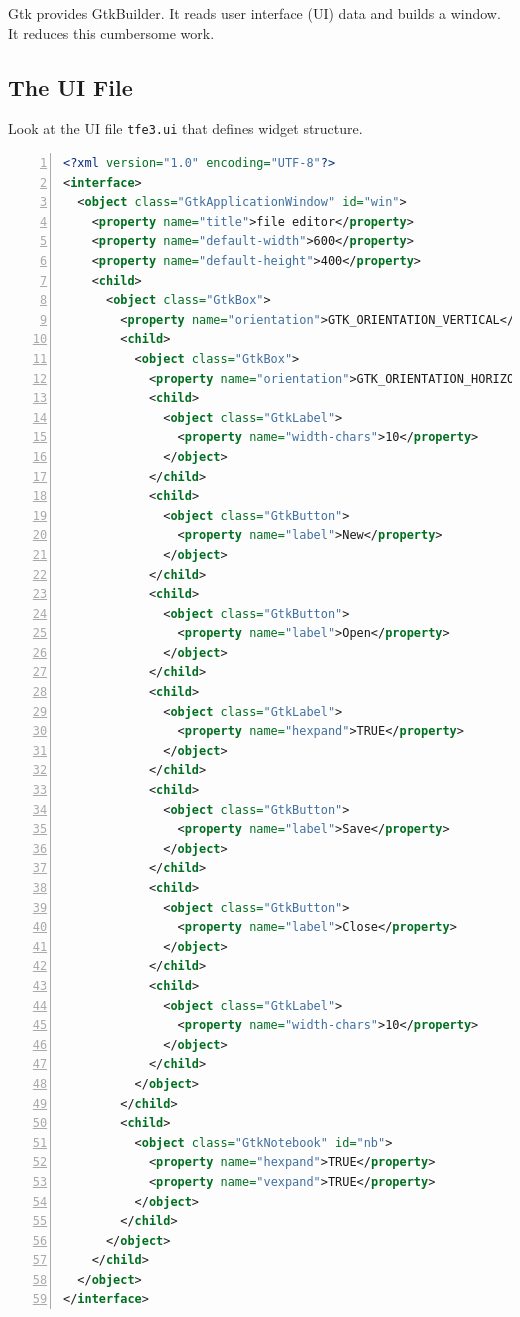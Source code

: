 Gtk provides GtkBuilder. It reads user interface (UI) data and builds a
window. It reduces this cumbersome work.

\subsection{The UI File}\label{the-ui-file}

Look at the UI file \passthrough{\lstinline!tfe3.ui!} that defines
widget structure.

\begin{lstlisting}[language=XML, numbers=left]
<?xml version="1.0" encoding="UTF-8"?>
<interface>
  <object class="GtkApplicationWindow" id="win">
    <property name="title">file editor</property>
    <property name="default-width">600</property>
    <property name="default-height">400</property>
    <child>
      <object class="GtkBox">
        <property name="orientation">GTK_ORIENTATION_VERTICAL</property>
        <child>
          <object class="GtkBox">
            <property name="orientation">GTK_ORIENTATION_HORIZONTAL</property>
            <child>
              <object class="GtkLabel">
                <property name="width-chars">10</property>
              </object>
            </child>
            <child>
              <object class="GtkButton">
                <property name="label">New</property>
              </object>
            </child>
            <child>
              <object class="GtkButton">
                <property name="label">Open</property>
              </object>
            </child>
            <child>
              <object class="GtkLabel">
                <property name="hexpand">TRUE</property>
              </object>
            </child>
            <child>
              <object class="GtkButton">
                <property name="label">Save</property>
              </object>
            </child>
            <child>
              <object class="GtkButton">
                <property name="label">Close</property>
              </object>
            </child>
            <child>
              <object class="GtkLabel">
                <property name="width-chars">10</property>
              </object>
            </child>
          </object>
        </child>
        <child>
          <object class="GtkNotebook" id="nb">
            <property name="hexpand">TRUE</property>
            <property name="vexpand">TRUE</property>
          </object>
        </child>
      </object>
    </child>
  </object>
</interface>
\end{lstlisting}

